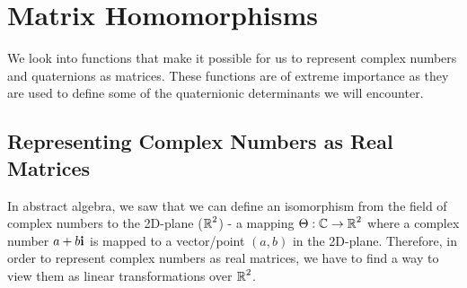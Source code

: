 \section{Matrix Homomorphisms}

We look into functions that make it possible for us to represent complex numbers and quaternions as matrices. These functions are of extreme importance as they are used to define some of the quaternionic determinants we will encounter.

\subsection{Representing Complex Numbers as Real Matrices}

In abstract algebra, we saw that we can define an isomorphism from the field of complex numbers to the 2D-plane ($\operatorname{\mathbb{R}}^2$) - a mapping $\Theta : \operatorname{\mathbb{C}} \rightarrow \operatorname{\mathbb{R}}^2$ where a complex number $a+b\textbf{i}$ is mapped to a vector/point $(a,b)$ in the 2D-plane. Therefore, in order to represent complex numbers as real matrices, we have to find a way to view them as linear transformations over $\operatorname{\mathbb{R}}^2$. 

